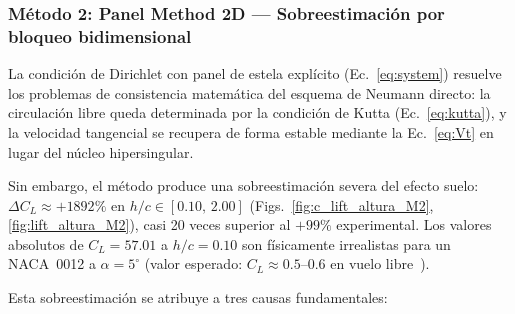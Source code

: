 \documentclass[twocolumn]{article}
\begin{document}
\subsubsection{Método 2: Panel Method 2D --- Sobreestimación por bloqueo bidimensional}
La condición de Dirichlet con panel de estela explícito (Ec.~\eqref{eq:system}) resuelve los problemas de consistencia matemática del esquema de Neumann directo: la circulación libre queda determinada por la condición de Kutta (Ec.~\eqref{eq:kutta}), y la velocidad tangencial se recupera de forma estable mediante la Ec.~\eqref{eq:Vt} en lugar del núcleo hipersingular.

Sin embargo, el método produce una sobreestimación severa del efecto
suelo: $\Delta C_L \approx +1892\%$ en $h/c \in [0.10,\, 2.00]$
(Figs.~\ref{fig:c_lift_altura_M2}, \ref{fig:lift_altura_M2}), casi
20 veces superior al $+99\%$ experimental. Los valores absolutos de
$C_L = 57.01$ a $h/c = 0.10$ son físicamente irrealistas para un
NACA~0012 a $\alpha = 5^\circ$ (valor esperado: $C_L \approx 0.5$--$0.6$ 
en vuelo libre~\cite{anderson2011}).

Esta sobreestimación se atribuye a tres causas fundamentales:
\end{document}
